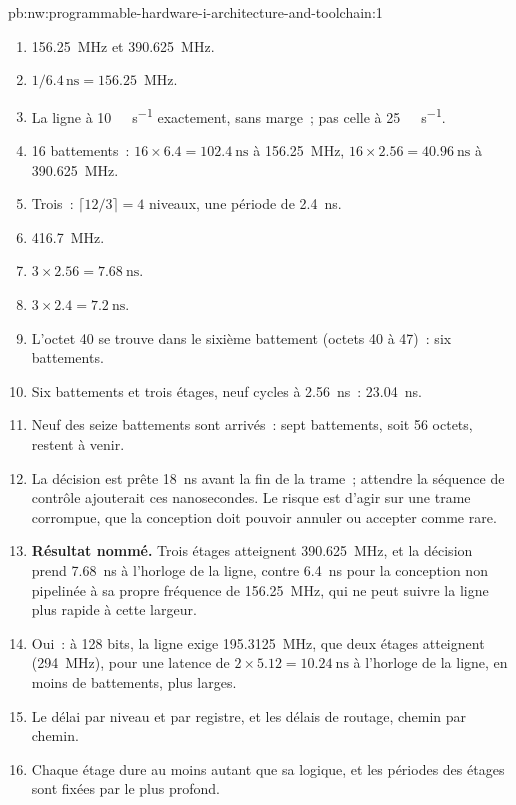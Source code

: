 \begin{solution}{pb:nw:programmable-hardware-i-architecture-and-toolchain:1}
\begin{enumerate}
\item 156.25~MHz et 390.625~MHz.
\item $1/6.4\,\mathrm{ns} = 156.25$~MHz.
\item La ligne à \qty{10}{\giga\bit\per\second} exactement, sans marge~; pas celle à \qty{25}{\giga\bit\per\second}.
\item 16 battements~: $16 \times 6.4 = \qty{102.4}{\nano\second}$ à 156.25~MHz, $16 \times 2.56 = \qty{40.96}{\nano\second}$ à 390.625~MHz.
\item Trois~: $\lceil 12/3\rceil = 4$ niveaux, une période de \qty{2.4}{\nano\second}.
\item 416.7~MHz.
\item $3 \times 2.56 = \qty{7.68}{\nano\second}$.
\item $3 \times 2.4 = \qty{7.2}{\nano\second}$.
\item L'octet 40 se trouve dans le sixième battement (octets 40 à 47)~: six battements.
\item Six battements et trois étages, neuf cycles à \qty{2.56}{\nano\second}~: \qty{23.04}{\nano\second}.
\item Neuf des seize battements sont arrivés~: sept battements, soit 56 octets, restent à venir.
\item La décision est prête \qty{18}{\nano\second} avant la fin de la trame~; attendre la séquence de contrôle ajouterait ces nanosecondes. Le risque est
  d'agir sur une trame corrompue, que la conception doit pouvoir annuler ou accepter comme rare.
\item \textbf{Résultat nommé.} Trois étages atteignent 390.625~MHz, et la décision prend \qty{7.68}{\nano\second} à l'horloge de la ligne, contre
  \qty{6.4}{\nano\second} pour la conception non pipelinée à sa propre fréquence de 156.25~MHz, qui ne peut suivre la ligne plus rapide à cette largeur.
\item Oui~: à 128 bits, la ligne exige 195.3125~MHz, que deux étages atteignent (294~MHz), pour une latence de $2 \times 5.12 = \qty{10.24}{\nano\second}$ à
  l'horloge de la ligne, en moins de battements, plus larges.
\item Le délai par niveau et par registre, et les délais de routage, chemin par chemin.
\item Chaque étage dure au moins autant que sa logique, et les périodes des étages sont fixées par le plus profond.

\end{enumerate}
\end{solution}
